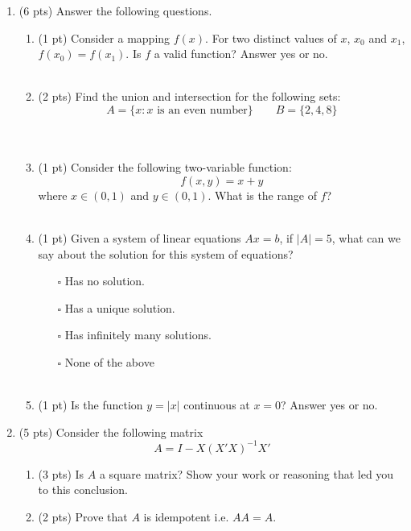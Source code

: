 \documentclass{./../../../Latex/tests}
\begin{document}
\thispagestyle{plain}

\vspace{0.5em}

\begin{enumerate}
\item (6 pts) Answer the following questions. 
\begin{enumerate}
\item (1 pt) Consider a mapping $f(x)$. For two distinct values of $x$, $x_0$ and $x_1$, $f(x_0) = f(x_1)$. Is $f$ a valid function? Answer yes or no. \\~\\
\item (2 pts) Find the union and intersection for the following sets:
$$ A = \{x: x \text{ is an even number} \} \quad \quad B = \{2, 4, 8 \} $$ \\~\\
\item (1 pt) Consider the following two-variable function: 
  $$ f(x,y) = x+y $$
  where $x \in (0,1)$ and $y \in (0,1)$. What is the range of $f$? \\~\\
 
\item (1 pt) Given a system of linear equations $A x = b$, if $|A|=5$, what can we say about the solution for this system of equations?
\begin{itemize}
	\item[$\square$] Has no solution. 
	\item[$\square$] Has a unique solution.
	\item[$\square$] Has infinitely many solutions.
	\item[$\square$] None of the above \\~\\
\end{itemize}  
\item (1 pt) Is the function $y=|x|$ continuous at $x=0$? Answer yes or no. 
\end{enumerate} 

\newpage
\item (5 pts) Consider the following matrix $$A = I - X(X'X)^{-1}X'$$
\begin{enumerate}
\item (3 pts)  Is $A$ a square matrix? Show your work or reasoning that led you to this conclusion. \vspace{2.5cm}
\item (2 pts) Prove that $A$ is idempotent i.e. $A A = A$. \vspace{5cm}
\end{enumerate} 


\end{enumerate}
\end{document}
